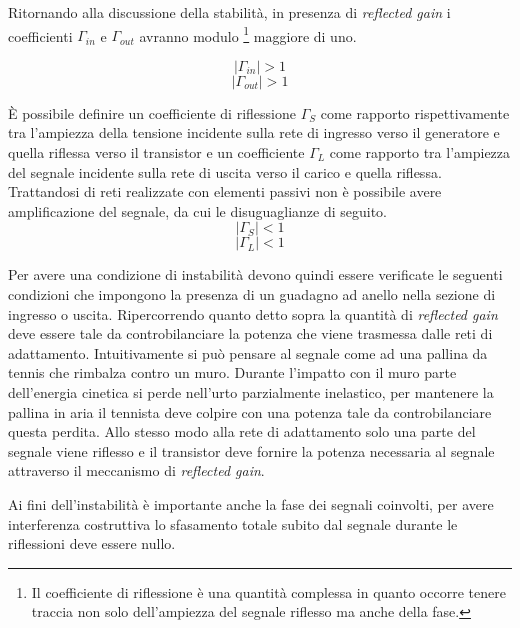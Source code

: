 \documentclass[12pt,oneside]{book}
\begin{document}
Ritornando alla discussione della stabilità, in presenza di \textit{reflected gain} i coefficienti $\Gamma_{in}$ e $\Gamma_{out}$ avranno modulo \footnote{Il coefficiente di riflessione è una quantità complessa in quanto occorre tenere traccia non solo dell'ampiezza del segnale riflesso ma anche della fase.} maggiore di uno.

\begin{equation}
    \left|\Gamma_{in}\right| > 1
\end{equation}
\begin{equation}
    \left|\Gamma_{out}\right| > 1
\end{equation}

È possibile definire un coefficiente di riflessione $\Gamma_{S}$ come rapporto rispettivamente tra l'ampiezza della tensione incidente sulla rete di ingresso verso il generatore e quella riflessa verso il transistor e un coefficiente $\Gamma_{L}$ come rapporto tra l'ampiezza del segnale incidente sulla rete di uscita verso il carico e quella riflessa. Trattandosi di reti realizzate con elementi passivi non è possibile avere amplificazione del segnale, da cui le disuguaglianze di seguito.
\begin{equation}
    \left|\Gamma_{S}\right| < 1
\end{equation}
\begin{equation}
    \left|\Gamma_{L}\right| < 1
\end{equation}

Per avere una condizione di instabilità devono quindi essere verificate le seguenti condizioni che impongono la presenza di un guadagno ad anello nella sezione di ingresso o uscita. Ripercorrendo quanto detto sopra la quantità di \textit{reflected gain} deve essere tale da controbilanciare la potenza che viene trasmessa dalle reti di adattamento. Intuitivamente si può pensare al segnale come ad una pallina da tennis che rimbalza contro un muro. Durante l'impatto con il muro parte dell'energia cinetica si perde nell'urto parzialmente inelastico, per mantenere la pallina in aria il tennista deve colpire con una potenza tale da controbilanciare questa perdita. Allo stesso modo alla rete di adattamento solo una parte del segnale viene riflesso e il transistor deve fornire la potenza necessaria al segnale attraverso il meccanismo di \textit{reflected gain}.

Ai fini dell'instabilità è importante anche la fase dei segnali coinvolti, per avere interferenza costruttiva lo sfasamento totale subito dal segnale durante le riflessioni deve essere nullo.
\end{document}
